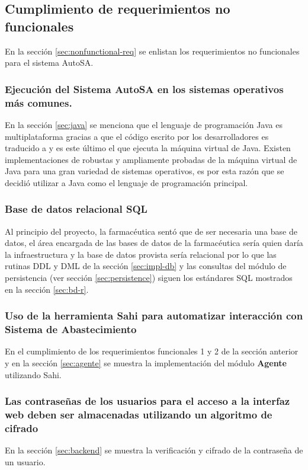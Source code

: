 \subsection{Cumplimiento de requerimientos no funcionales}
En la sección \ref{sec:nonfunctional-req} se enlistan los requerimientos no funcionales para el sistema AutoSA.

\subsubsection{Ejecución del Sistema AutoSA en los sistemas operativos más comunes.}
En la sección \ref{sec:java} se menciona que el lenguaje de programación Java es multiplataforma gracias a que el código escrito por los desarrolladores es traducido a  y es este último el que ejecuta la máquina virtual de Java. Existen implementaciones de robustas y ampliamente probadas de la máquina virtual de Java para una gran variedad de sistemas operativos, es por esta razón que se decidió utilizar a Java como el lenguaje de programación principal.

\subsubsection{Base de datos relacional SQL}
Al principio del proyecto, la farmacéutica sentó que de ser necesaria una base de datos, el área encargada de las bases de datos de la farmacéutica sería quien daría la infraestructura y la base de datos provista sería relacional por lo que las rutinas DDL y DML de la sección \ref{sec:impl-db} y las consultas del módulo de persistencia (ver sección \ref{sec:persistence}) siguen los estándares SQL mostrados en la sección \ref{sec:bd-r}.

\subsubsection{Uso de la herramienta Sahi para automatizar interacción con Sistema de Abastecimiento}
En el cumplimiento de los requerimientos funcionales 1 y 2 de la sección anterior y en la sección \ref{sec:agente} se muestra la implementación del módulo \textbf{Agente} utilizando Sahi.

\subsubsection{Las contraseñas de los usuarios para el acceso a la interfaz web deben ser almacenadas utilizando un algoritmo de cifrado}
En la sección \ref{sec:backend} se muestra la verificación y cifrado de la contraseña de un usuario.


